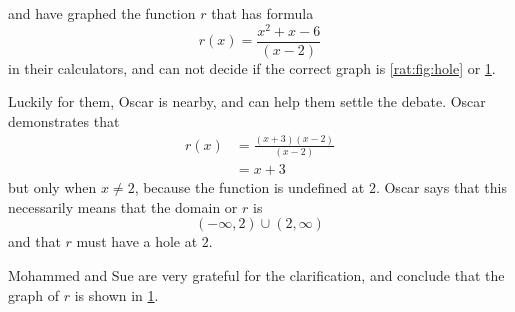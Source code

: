 	 \begin{pccexample}
		  and  have graphed the function $r$ that has formula
		 \[
			 r(x)=\frac{x^2+x-6}{(x-2)}
		 \]
		 in their calculators, and can not decide if the correct graph
		 is \cref{rat:fig:hole} or \cref{rat:fig:hole1}.

		 Luckily for them, Oscar is nearby, and can help them settle the debate.
		 Oscar demonstrates that
		 \begin{align*}
			 r(x) & =\frac{(x+3)(x-2)}{(x-2)} \\
			      & = x+3
		 \end{align*}
		 but only when $x\ne 2$, because the function is undefined at $2$. Oscar
		 says that this necessarily means that the domain or $r$ is
		 \[
			 (-\infty,2)\cup(2,\infty)
		 \]
		 and that $r$ must have a hole at $2$.

		 Mohammed and Sue are very grateful for the clarification, and conclude that
		 the graph of $r$ is shown in \cref{rat:fig:hole1}.
		 \begin{figure}[!htb]
			 \begin{minipage}{.45\textwidth}
				 \caption{}
				 \label{rat:fig:hole}
			 \end{minipage}%
			 \hfill
			 \begin{minipage}{.45\textwidth}
				 \caption{}
				 \label{rat:fig:hole1}
			 \end{minipage}%
		 \end{figure}
	 \end{pccexample}

